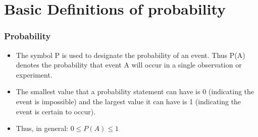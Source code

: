 \documentclass{beamer}
\begin{document}
\section{Basic Definitions of probability}
\begin{frame}
\frametitle{Probability}
\Large
\begin{itemize}
\item The symbol P is used to designate the probability of an event. Thus P(A) denotes the probability that event
A will occur in a single observation or experiment.

\item The smallest value that a probability statement can have is 0 (indicating the event is impossible) and the
largest value it can have is 1 (indicating the event is certain to occur). 
\item Thus, in general:
$0 	\leq P(A) \leq 1$
\end{itemize}
\end{frame}
\end{document}
